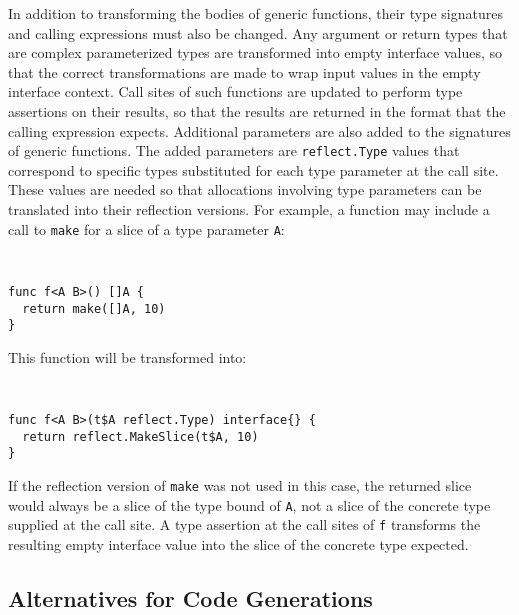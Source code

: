 \documentclass[letterpaper,twocolumn,11pt]{article}
\begin{document}
In addition to transforming the bodies of generic functions, their type signatures and calling expressions must also be changed. Any argument or return types that are complex parameterized types are transformed into empty interface values, so that the correct transformations are made to wrap input values in the empty interface context. Call sites of such functions are updated to perform type assertions on their results, so that the results are returned in the format that the calling expression expects. Additional parameters are also added to the signatures of generic functions. The added parameters are \texttt{reflect.Type} values that correspond to specific types substituted for each type parameter at the call site. These values are needed so that allocations involving type parameters can be translated into their reflection versions. For example, a function may include a call to \texttt{make} for a slice of a type parameter \texttt{A}:
{ \tt \small
\begin{verbatim}
func f<A B>() []A {
  return make([]A, 10)
}
\end{verbatim} 
}
This function will be transformed into:
{ \tt \small
\begin{verbatim}
func f<A B>(t$A reflect.Type) interface{} {
  return reflect.MakeSlice(t$A, 10)
}
\end{verbatim} 
}

If the reflection version of \texttt{make} was not used in this case, the returned slice would always be a slice of the type bound of \texttt{A}, not a slice of the concrete type supplied at the call site. A type assertion at the call sites of \texttt{f} transforms the resulting empty interface value into the slice of the concrete type expected.

\subsection{Alternatives for Code Generations} \label{code_gen_alt}
\end{document}
